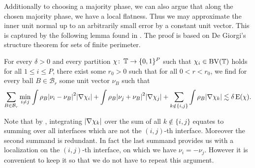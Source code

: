 Additionally to choosing a majority phase, we can also argue that along the 
chosen majority phase, we have a local flatness. Thus we may approximate the 
inner unit normal up to an arbitrarily small error by a constant unit vector. 
This is captured by the following lemma found in 
\cite{laux_otto_convergence_of_thresholding_scheme_for_mmcf}. The proof is 
based on De Giorgi's structure theorem for sets of finite perimeter.

\begin{lemma}
	\label{localization_lemma_with_normals}
	For every $ \delta > 0 $ and every partition $ \chi \colon \operatorname{\mathbb{T}} \to 
	\{ 0 , 1 \}^{ P } $ such that $ \chi_{ i } \in \operatorname{BV} ( \operatorname{\mathbb{T}} ) $ holds 
	for all $ 1 \leq i \leq P $, there exist some $ r_{ 0 } > 0 $ such that for 
	all $ 0 < r < r_{ 0 } $, we find for every ball $ B \in \mathcal{B}_{ r } $ 
	some unit vector $ \nu_{ B } $ such that
	\begin{equation*}
		\sum_{ B \in \mathcal{B}_{ r } }
		\min_{ i \neq j }
		\int
		\rho_{ B }
		\abs{ \nu_{ i } - \nu_{ B } }^{ 2 }
		\abs{ \nabla \chi_{ i } }
		+
		\int
		\rho_{ B }
		\abs{ \nu_{ j } + \nu_{ B } }^{ 2 }
		\abs{ \nabla \chi_{ j } }
		+
		\sum_{ k \notin \{ i , j \} }
		\int 
		\rho_{ B }
		\abs{ \nabla \chi_{ k } }
		\lesssim
		\delta \operatorname{E} ( \chi ).
	\end{equation*}
\end{lemma}

Note that by , integrating  $ 
\abs{ \nabla \chi_{ k } } $ over the sum of all $ k \notin \{ i , j \} $ 
equates to summing over all interfaces which are not the $ (i,j)$-th interface. 
Moreover the second summand is redundant. In fact the last 
summand provides us with a localization on the $ (i,j)$-th interface, on which 
we have $ \nu_{ i } = - \nu_{ j } $.
However it is convenient to keep it so that we do not have to repeat this 
argument.

